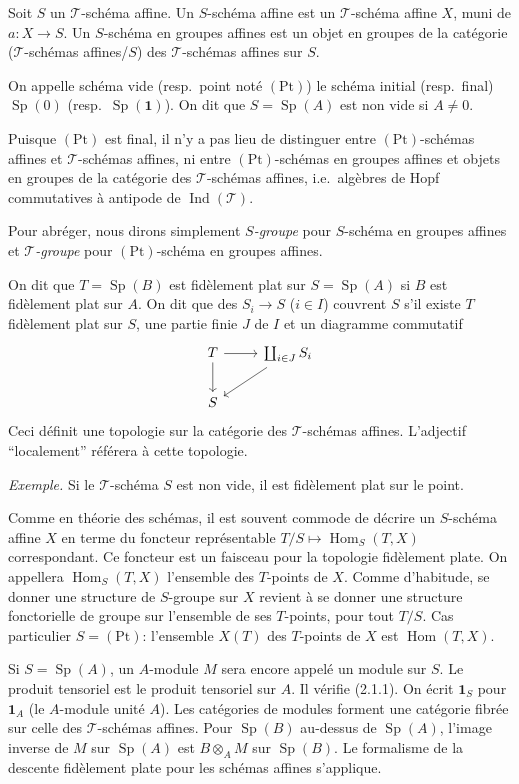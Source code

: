 \documentclass[12pt,a4paper]{article}
\theoremstyle{plain}
\theoremstyle{definition}
\DeclareMathOperator{\Sp}{Sp}
\DeclareMathOperator{\Hom}{Hom}
\DeclareMathOperator{\Ind}{Ind}
\begin{document}
Soit $S$ un $\mathcal{T}$-schéma affine. Un $S$-schéma affine est un $\mathcal{T}$-schéma affine $X$, muni de $a : X \to S$. Un $S$-schéma en groupes affines est un objet en groupes de la catégorie ($\mathcal{T}$-schémas affines/$S$) des $\mathcal{T}$-schémas affines sur $S$.

On appelle schéma vide (resp.~point noté $(\mathrm{Pt})$) le schéma initial (resp.~final) $\Sp(0)$ (resp.~$\Sp(\mathbf{1})$). On dit que $S = \Sp(A)$ est non vide si $A \neq 0$.

Puisque $(\mathrm{Pt})$ est final, il n'y a pas lieu de distinguer entre $(\mathrm{Pt})$-schémas affines et $\mathcal{T}$-schémas affines, ni entre $(\mathrm{Pt})$-schémas en groupes affines et objets en groupes de la catégorie des $\mathcal{T}$-schémas affines, i.e.~algèbres de Hopf commutatives à antipode de $\Ind(\mathcal{T})$.

Pour abréger, nous dirons simplement $S$\emph{-groupe} pour $S$-schéma en groupes affines et $\mathcal{T}$\emph{-groupe} pour $(\mathrm{Pt})$-schéma en groupes affines.

On dit que $T = \Sp(B)$ est fidèlement plat sur $S = \Sp(A)$ si $B$ est fidèlement plat sur $A$. On dit que des $S_i \to S$ ($i \in I$) couvrent $S$ s'il existe $T$ fidèlement plat sur $S$, une partie finie $J$ de $I$ et un diagramme commutatif
\[
\begin{tikzcd}
T \arrow[r] \arrow[d] & \coprod_{i \in J} S_i \arrow[dl] \\
S
\end{tikzcd}
\]
Ceci définit une topologie sur la catégorie des $\mathcal{T}$-schémas affines. L'adjectif ``localement'' référera à cette topologie.

\textit{Exemple.} Si le $\mathcal{T}$-schéma $S$ est non vide, il est fidèlement plat sur le point.

Comme en théorie des schémas, il est souvent commode de décrire un $S$-schéma affine $X$ en terme du foncteur représentable $T/S \mapsto \Hom_S(T, X)$ correspondant. Ce foncteur est un faisceau pour la topologie fidèlement plate. On appellera $\Hom_S(T, X)$ l'ensemble des $T$-points de $X$. Comme d'habitude, se donner une structure de $S$-groupe sur $X$ revient à se donner une structure fonctorielle de groupe sur l'ensemble de ses $T$-points, pour tout $T/S$. Cas particulier $S = (\mathrm{Pt})$: l'ensemble $X(T)$ des $T$-points de $X$ est $\Hom(T, X)$.

Si $S = \Sp(A)$, un $A$-module $M$ sera encore appelé un module sur $S$. Le produit tensoriel est le produit tensoriel sur $A$. Il vérifie (2.1.1). On écrit $\mathbf{1}_S$ pour $\mathbf{1}_A$ (le $A$-module unité $A$). Les catégories de modules forment une catégorie fibrée sur celle des $\mathcal{T}$-schémas affines. Pour $\Sp(B)$ au-dessus de $\Sp(A)$, l'image inverse de $M$ sur $\Sp(A)$ est $B \otimes_A M$ sur $\Sp(B)$. Le formalisme de la descente fidèlement plate pour les schémas affines s'applique.
\end{document}
